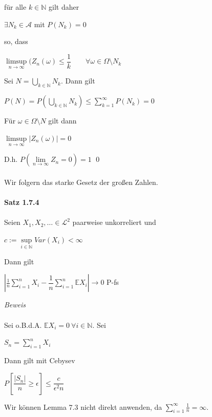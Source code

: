 \documentclass[10pt,a4paper]{report}
\newcommand{\E}{\mathbb{E}}
\numberwithin{equation}{section}
\numberwithin{figure}{section}
\theoremstyle{plain}
\theoremstyle{definition}
\theoremstyle{plain}
\theoremstyle{definition}
\theoremstyle{remark}
\theoremstyle{plain}
\theoremstyle{plain}
\theoremstyle{plain}
\newcommand{\1}{ \mathbb{1} } %
\begin{document}
für alle $k \in \mathbb{N}$ gilt daher
\begin{center}
$\exists N_k \in \mathcal{A}$ mit $P(N_k)=0$
\end{center}
so, dass
\begin{center}
$\limsup\limits_{n \to \infty} (Z_n(\omega)\leq \dfrac{1}{k}\qquad \forall\omega \in \Omega\setminus N_k$
\end{center}
Sei $N=\bigcup\limits_{k \in \mathbb{N}}N_k$. Dann gilt
\begin{center}
$P(N)=P\left(\bigcup\limits_{k \in \mathbb{N}}N_k\right)\leq \sum\limits_{k=1}^\infty P(N_k)=0$
\end{center}
Für $\omega \in \Omega\setminus N$ gilt dann
\begin{center}
$\limsup\limits_{n \to \infty} |Z_n(\omega)|=0$
\end{center}
D.h. $P\left(\lim\limits_{n \to \infty}Z_n=0\right)=1$ \qed\\\\
Wir folgern das starke Gesetz der großen Zahlen.\\\\
\textbf{Satz 1.7.4}\\\\
Seien $X_1,X_2,\ldots \in \mathcal{L}^2$ paarweise unkorreliert und
\begin{center}
$c:=\sup\limits_{i \in \mathbb{N}} Var(X_i) < \infty$
\end{center}
Dann gilt
\begin{center}
$\left|\frac{1}{n}\sum\limits_{i=1}^nX_i-\dfrac{1}{n}\sum\limits_{i=1}^n\mathbb{E}X_i\right| \to 0$ P-fs
\end{center}
\textit{Beweis}\\\\
Sei o.B.d.A. $\E X_i=0 ~ \forall i \in \mathbb{N}$. Sei
\begin{center}
$S_n=\sum\limits_{i=1}^nX_i$
\end{center}
Dann gilt mit Cebysev
\begin{center}
$P\left[\dfrac{|S_n|}{n}\geq \epsilon\right]\leq \dfrac{c}{\epsilon^2n}$
\end{center}
Wir können Lemma 7.3 nicht direkt anwenden, da $\sum\limits_{i=1}^\infty \frac{1}{n}=\infty$.
\end{document}
